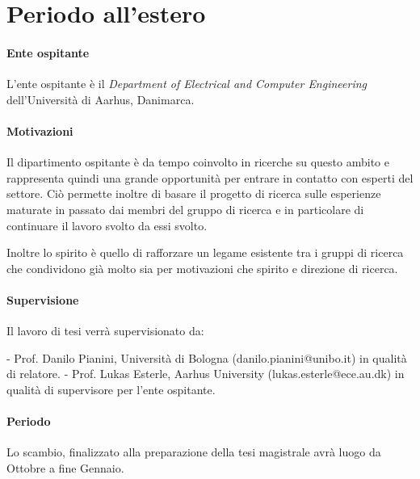 \documentclass[12pt, a4paper]{article}
\begin{document}
\section{Periodo all'estero}

\paragraph{Ente ospitante}
L'ente ospitante è il \textit{Department of Electrical and Computer Engineering} dell'Università di Aarhus, Danimarca.

\paragraph{Motivazioni}
Il dipartimento ospitante è da tempo coinvolto in ricerche su questo ambito e rappresenta
quindi una grande opportunità per entrare in contatto con esperti del settore.
Ciò permette inoltre di basare il progetto di ricerca sulle esperienze maturate in passato
dai membri del gruppo di ricerca e in particolare di continuare il lavoro svolto da essi svolto.

Inoltre lo spirito è quello di rafforzare un legame esistente tra i gruppi di ricerca che
condividono già molto sia per motivazioni che spirito e direzione di ricerca.

\paragraph{Supervisione}
Il lavoro di tesi verrà supervisionato da:

- Prof. Danilo Pianini, Università di Bologna (danilo.pianini@unibo.it) in qualità di relatore.
- Prof. Lukas Esterle, Aarhus University (lukas.esterle@ece.au.dk) in qualità di supervisore per l'ente ospitante.

\paragraph{Periodo}
Lo scambio, finalizzato alla preparazione della tesi magistrale avrà luogo da Ottobre a fine Gennaio.




\end{document}
